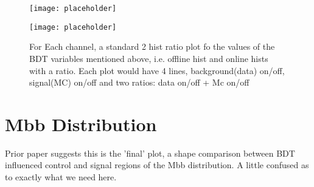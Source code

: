 		\begin{figure}[h]
			\centering
			
			\begin{minipage}[h]{0.33\linewidth}
				\texttt{[image: placeholder]}
			\end{minipage}
			\quad
			\begin{minipage}[h]{0.33\linewidth}
				\texttt{[image: placeholder]}
			\end{minipage}
			\caption{For Each channel, a standard 2 hist ratio plot fo the values of the BDT variables mentioned above, i.e. offline hist and online hists with a ratio. Each plot would have 4 lines, background(data) on/off, signal(MC) on/off and two ratios: data on/off + Mc on/off}
				\label{fig:bdtmjj}
		\end{figure}


\section{Mbb Distribution}

	Prior paper suggests this is the 'final' plot, a shape comparison between BDT influenced control and signal regions of the Mbb distribution. A little confused as to exactly what we need here.

\endinput
